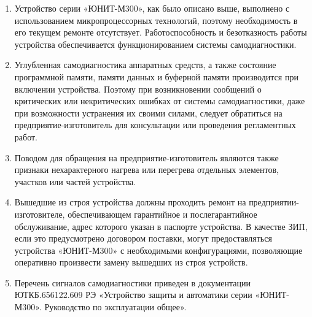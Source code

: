 \begin{enumerate}

\item
Устройство серии «ЮНИТ-М300», как было описано выше, выполнено с использованием микропроцессорных технологий, поэтому необходимость в его текущем ремонте отсутствует. Работоспособность и безотказность работы устройства обеспечивается функционированием системы самодиагностики.
\item
Углубленная самодиагностика аппаратных средств, а также состояние программной памяти, памяти данных  и  буферной  памяти  производится  при  включении  устройства.  Поэтому  при  возникновении сообщений о критических или некритических ошибках от системы самодиагностики, даже при возможности устранения  их  своими  силами,  следует  обратиться  на  предприятие-изготовитель для  консультации или проведения регламентных работ.
\item 
Поводом  для  обращения  на  предприятие-изготовитель  являются  также  признаки  нехарактерного нагрева или перегрева отдельных элементов, участков или частей устройства.
\item
Вышедшие  из  строя  устройства  должны  проходить  ремонт  на  предприятии-изготовителе, обеспечивающем  гарантийное  и  послегарантийное  обслуживание, адрес которого  указан  в  паспорте устройства.  В  качестве  ЗИП,  если  это  предусмотрено  договором  поставки,  могут  предоставляться устройства  «ЮНИТ-М300» с необходимыми  конфигурациями,  позволяющие  оперативно  произвести  замену вышедших из строя устройств.
\item
Перечень сигналов самодиагностики приведен в документации ЮТКБ.656122.609 РЭ «Устройство защиты и автоматики серии «ЮНИТ-М300». Руководство по эксплуатации общее».
\end{enumerate}

